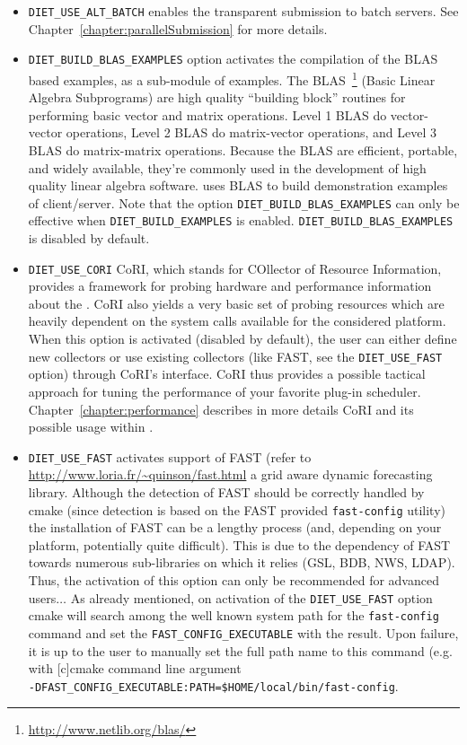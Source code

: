 \begin{itemize}
\item
  \verb+DIET_USE_ALT_BATCH+ enables the transparent submission to
  batch servers. See Chapter~\ref{chapter:parallelSubmission} for more
  details.

\item
  \verb+DIET_BUILD_BLAS_EXAMPLES+ option activates the compilation of
  the BLAS based \diet examples, as a sub-module of examples.  The
  BLAS~\footnote{\url{http://www.netlib.org/blas/}} (Basic Linear
  Algebra Subprograms) are high quality ``building block'' routines
  for performing basic vector and matrix operations.  Level 1 BLAS do
  vector-vector operations, Level 2 BLAS do matrix-vector operations,
  and Level 3 BLAS do matrix-matrix operations.  Because the BLAS are
  efficient, portable, and widely available, they're commonly used in
  the development of high quality linear algebra software. \diet uses
  BLAS to build demonstration examples of client/server.  Note that
  the option \verb+DIET_BUILD_BLAS_EXAMPLES+ can only be effective
  when \verb+DIET_BUILD_EXAMPLES+ is enabled.
  \verb+DIET_BUILD_BLAS_EXAMPLES+ is disabled by default.

\item
  \verb+DIET_USE_CORI+ CoRI, which stands for COllector of Resource
  Information, provides a framework for probing hardware and
  performance information about the \sed. CoRI also yields a very
  basic set of probing resources which are heavily dependent on the
  system calls available for the considered platform.  When this
  option is activated (disabled by default), the user can either
  define new collectors or use existing collectors (like FAST, see the
  \verb+DIET_USE_FAST+ option) through CoRI's interface. CoRI thus
  provides a possible tactical approach for tuning the performance of
  your favorite plug-in scheduler.  Chapter~\ref{chapter:performance}
  describes in more details CoRI and its possible usage within \diet.

\item
  \verb+DIET_USE_FAST+ activates \diet support of FAST (refer to
  \url{http://www.loria.fr/~quinson/fast.html} a grid aware dynamic
  forecasting library. Although the detection of FAST should be
  correctly handled by cmake (since detection is based on the FAST
  provided \verb+fast-config+ utility) the installation of FAST can be
  a lengthy process (and, depending on your platform, potentially
  quite difficult). This is due to the dependency of FAST towards
  numerous sub-libraries on which it relies (GSL, BDB, NWS, LDAP).
  Thus, the activation of this option can only be recommended for
  advanced users$\ldots$ As already mentioned, on activation of the
  \verb+DIET_USE_FAST+ option cmake will search among the well known
  system path for the \verb+fast-config+ command and set the
  \verb+FAST_CONFIG_EXECUTABLE+ with the result. Upon failure, it is
  up to the user to manually set the full path name to this command
  (e.g. with [c]cmake command line argument\\ 
  \verb+-DFAST_CONFIG_EXECUTABLE:PATH=$HOME/local/bin/fast-config+.


\end{itemize}
